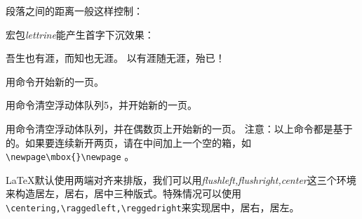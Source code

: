 段落之间的距离一般这样控制：

\begin{latex}{}
\setlength{\parskip}{0pt plus 1pt}%
\end{latex}

宏包\emph{lettrine}能产生首字下沉效果：

\begin{codeshow}
	\lettrine{吾}{}生也有涯，而知也无涯。
	以有涯随无涯，殆已！
\end{codeshow}

用命令开始新的一页。

用命令清空浮动体队列5，并开始新的一页。

用命令清空浮动体队列，并在偶数页上开始新的一页。
注意：以上命令都是基于的。如果要连续新开两页，请在中间加上一个空的箱，如\verb|\newpage\mbox{}\newpage| 。

\LaTeX 默认使用两端对齐来排版，我们可以用\emph{flushleft,flushright,center}这三个环境来构造居左，居右，居中三种版式。特殊情况可以使用\verb|\centering,\raggedleft,\reggedright|来实现居中，居右，居左。








